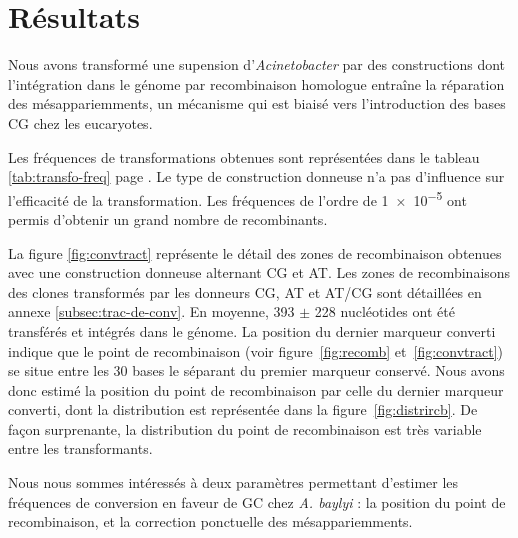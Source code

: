 \section{Résultats}
\label{sec:resultats}

Nous avons transformé une supension d'\emph{Acinetobacter} par des constructions
dont l'intégration dans le génome par recombinaison homologue entraîne la
réparation des mésappariemments, un mécanisme qui est biaisé vers l'introduction
des bases CG chez les eucaryotes.

Les fréquences de transformations obtenues sont représentées dans le tableau
\ref{tab:transfo-freq} page \pageref{tab:transfo-freq}. Le type de construction
donneuse n'a pas d'influence sur l'efficacité de la transformation. Les
fréquences de l'ordre de \num{1e-5} ont permis d'obtenir un grand nombre de
recombinants.

La figure \ref{fig:convtract} représente le détail des zones de recombinaison
obtenues avec une construction donneuse alternant CG et AT. Les zones de
recombinaisons des clones transformés par les donneurs CG, AT et AT/CG sont
détaillées en annexe \ref{subsec:trac-de-conv}. En moyenne, \num{393} \(\pm\)
\num{228} nucléotides ont été transférés et intégrés dans le génome. La position
du dernier marqueur converti indique que le point de recombinaison (voir
figure~\ref{fig:recomb} et~\ref{fig:convtract}) se situe entre les 30 bases le
séparant du premier marqueur conservé. Nous avons donc estimé la position du
point de recombinaison par celle du dernier marqueur converti, dont la
distribution est représentée dans la figure~\ref{fig:distrircb}. De façon
surprenante, la distribution du point de recombinaison est très variable entre
les transformants.

Nous nous sommes intéressés à deux paramètres permettant d'estimer les
fréquences de conversion en faveur de GC chez \emph{A. baylyi} : la position du
point de recombinaison, et la correction ponctuelle des mésappariemments.

